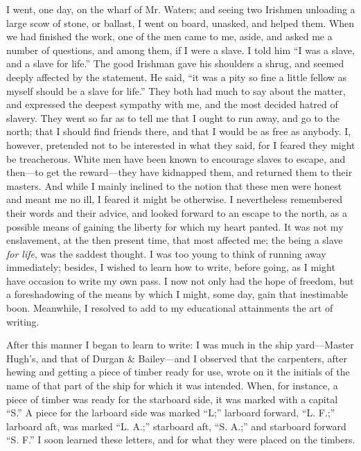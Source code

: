 I went, one day, on the wharf of Mr. Waters; and seeing two Irishmen
unloading a large scow of stone, or ballast, I went on board, unasked,
and helped them. When we had finished the work, one of the men came to
me, aside, and asked me a number of questions, and among them, if I were
a slave. I told him {\protect\hypertarget{170}{}{}}``I was a slave, and
a slave for life.'' The good Irishman gave his shoulders a shrug, and
seemed deeply affected by the statement. He said, ``it was a pity so
fine a little fellow as myself should be a slave for life.'' They both
had much to say about the matter, and expressed the deepest sympathy
with me, and the most decided hatred of slavery. They went so far as to
tell me that I ought to run away, and go to the north; that I should
find friends there, and that I would be as free as anybody. I, however,
pretended not to be interested in what they said, for I feared they
might be treacherous. White men have been known to encourage slaves to
escape, and then---to get the reward---they have kidnapped them, and
returned them to their masters. And while I mainly inclined to the
notion that these men were honest and meant me no ill, I feared it might
be otherwise. I nevertheless remembered their words and their advice,
and looked forward to an escape to the north, as a possible means of
gaining the liberty for which my heart panted. It was not my
enslavement, at the then present time, that most affected me; the being
a slave \emph{for life}, was the saddest thought. I was too young to
think of running away immediately; besides, I wished to learn how to
write, before going, as I might have occasion to write my own pass. I
now not only had the hope of freedom, but a foreshadowing of the means
by which I might, some day, gain that inestimable boon. Meanwhile, I
resolved to add to my educational attainments the art of writing.

After this manner I began to learn to write: I was much in the ship
yard---Master Hugh's, and that of {\protect\hypertarget{171}{}{}}Durgan
\& Bailey---and I observed that the carpenters, after hewing and getting
a piece of timber ready for use, wrote on it the initials of the name of
that part of the ship for which it was intended. When, for instance, a
piece of timber was ready for the starboard side, it was marked with a
capital ``S.'' A piece for the larboard side was marked ``L;'' larboard
forward, ``L. F.;'' larboard aft, was marked ``L. A.;'' starboard aft,
``S. A.;'' and starboard forward ``S. F.'' I soon learned these letters,
and for what they were placed on the timbers.

